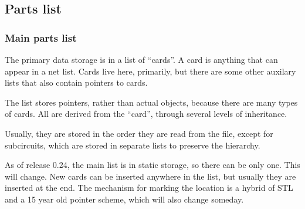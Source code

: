 %
%
%
%
\subsection{Parts list}
\subsubsection{Main parts list}

The primary data storage is in a list of ``cards''.  A card is
anything that can appear in a net list.  Cards live here, primarily,
but there are some other auxilary lists that also contain pointers to
cards.

The list stores pointers, rather than actual objects, because there
are many types of cards.  All are derived from the ``card'', through
several levels of inheritance.

Usually, they are stored in the order they are read from the file,
except for subcircuits, which are stored in separate lists to preserve 
the hierarchy.

As of release 0.24, the main list is in static storage, so there can
be only one.  This will change.  New cards can be inserted anywhere in 
the list, but usually they are inserted at the end.  The mechanism for 
marking the location is a hybrid of STL and a 15 year old pointer
scheme, which will also change someday.
